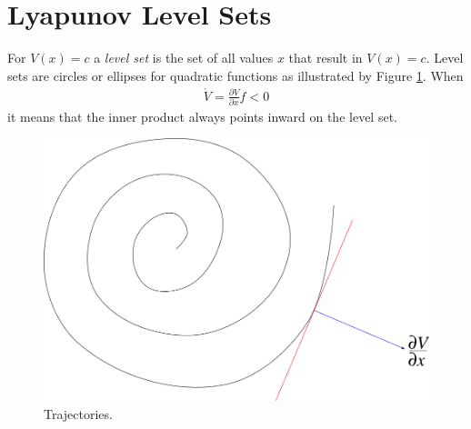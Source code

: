 \section{Lyapunov Level Sets}
For $V(x)=c$ a \textit{level set} is the set of all values $x$ that result in $V(x)=c$. Level sets are circles or ellipses for quadratic functions as illustrated by Figure \ref{fig:08levelSets}. When
\begin{align*}
\dot{V} = \frac{\partial V}{\partial x}f<0
\end{align*}
it means that the inner product always points inward on the level set.

\begin{figure}[ht!]
	\centering
	\includegraphics[width=.4\textwidth]{images/08levelSets}
	\caption{Trajectories.}
	\label{fig:08levelSets}
\end{figure}


